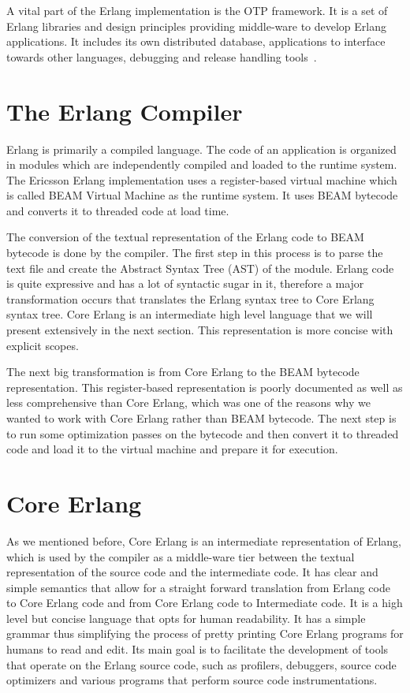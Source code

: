 A vital part of the Erlang implementation is the OTP framework. It is a set of
Erlang libraries and design principles providing middle-ware to develop Erlang
applications. It includes its own distributed database, applications to
interface towards other languages, debugging and release handling tools~\cite{erlang_site}.


\section{The Erlang Compiler}\label{sec:erlang_compiler}

Erlang is primarily a compiled language. The code of an application is
organized in modules which are independently compiled and loaded to the runtime
system. The Ericsson Erlang implementation uses a register-based virtual
machine which is called BEAM Virtual Machine as the runtime system. It uses
BEAM bytecode and converts it to threaded code at load time.

The conversion of the textual representation of the Erlang code to BEAM
bytecode is done by the compiler. The first step in this process is to parse
the text file and create the Abstract Syntax Tree (AST) of the module. Erlang
code is quite expressive and has a lot of syntactic sugar in it, therefore a
major transformation occurs that translates the Erlang syntax tree to Core
Erlang syntax tree. Core Erlang is an intermediate high level language that we
will present extensively in the next section. This representation is more
concise with explicit scopes.

The next big transformation is from Core Erlang to the BEAM bytecode
representation. This register-based representation is poorly documented as well
as less comprehensive than Core Erlang, which was one of the reasons why we
wanted to work with Core Erlang rather than BEAM bytecode. The next step is to
run some optimization passes on the bytecode and then convert it to threaded
code and load it to the virtual machine and prepare it for execution.

\section{Core Erlang}\label{sec:core_erlang}

As we mentioned before, Core Erlang is an intermediate representation of
Erlang, which is used by the compiler as a middle-ware tier between the textual
representation of the source code and the intermediate code. It has clear and
simple semantics that allow for a straight forward translation from Erlang code
to Core Erlang code and from Core Erlang code to Intermediate code. It is a
high level but concise language that opts for human readability. It has a
simple grammar thus simplifying the process of pretty printing Core Erlang
programs for humans to read and edit. Its main goal is to facilitate the
development of tools that operate on the Erlang source code, such as profilers,
debuggers, source code optimizers and various programs that perform source code
instrumentations.

